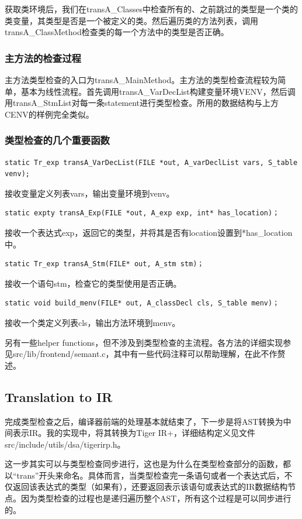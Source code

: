 \documentclass{article}
\begin{document}
获取类环境后，我们在transA\_Classes中检查所有的、之前跳过的类型是一个类的类变量，其类型是否是一个被定义的类。然后遍历类的方法列表，调用transA\_ClassMethod检查类的每一个方法中的类型是否正确。

\subsubsection{主方法的检查过程}
主方法类型检查的入口为transA\_MainMethod。主方法的类型检查流程较为简单，基本为线性流程。首先调用transA\_VarDecList构建变量环境VENV，然后调用transA\_StmList对每一条statement进行类型检查。所用的数据结构与上方CENV的样例完全类似。

\subsubsection{类型检查的几个重要函数}
\begin{lstlisting}
static Tr_exp transA_VarDecList(FILE *out, A_varDeclList vars, S_table venv);
\end{lstlisting}
接收变量定义列表vars，输出变量环境到venv。

\begin{lstlisting}
static expty transA_Exp(FILE *out, A_exp exp, int* has_location)；
\end{lstlisting}
接收一个表达式exp，返回它的类型，并将其是否有location设置到*has\_location中。

\begin{lstlisting}
static Tr_exp transA_Stm(FILE* out, A_stm stm)；
\end{lstlisting}
接收一个语句stm，检查它的类型使用是否正确。

\begin{lstlisting}
static void build_menv(FILE* out, A_classDecl cls, S_table menv)；
\end{lstlisting}
接收一个类定义列表cls，输出方法环境到menv。

另有一些helper functions，但不涉及到类型检查的主流程。各方法的详细实现参见src/lib/frontend/semant.c，其中有一些代码注释可以帮助理解，在此不作赘述。

\subsection{Translation to IR}
完成类型检查之后，编译器前端的处理基本就结束了，下一步是将AST转换为中间表示IR。我的实现中，将其转换为Tiger IR+，详细结构定义见文件src/include/utils/dsa/tigerirp.h。

这一步其实可以与类型检查同步进行，这也是为什么在类型检查部分的函数，都以“trans”开头来命名。具体而言，当类型检查完一条语句或者一个表达式后，不仅返回该表达式的类型（如果有），还要返回表示该语句或表达式的IR数据结构节点。因为类型检查的过程也是递归遍历整个AST，所有这个过程是可以同步进行的。
\end{document}
